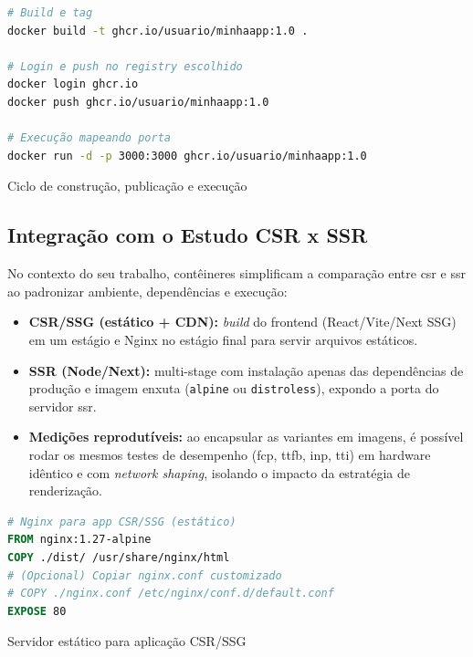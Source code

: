 \begin{codigo}[H]
\begin{lstlisting}[language=bash]
# Build e tag
docker build -t ghcr.io/usuario/minhaapp:1.0 .

# Login e push no registry escolhido
docker login ghcr.io
docker push ghcr.io/usuario/minhaapp:1.0

# Execução mapeando porta
docker run -d -p 3000:3000 ghcr.io/usuario/minhaapp:1.0
\end{lstlisting}
\caption{Ciclo de construção, publicação e execução}
\label{lst:docker-workflow}
\end{codigo}

\subsection{Integração com o Estudo CSR x SSR}
\label{sec:docker-csr-ssr}

No contexto do seu trabalho, contêineres simplificam a comparação entre \acrshort{csr} e \acrshort{ssr} ao padronizar ambiente, dependências e execução:

\begin{itemize}
  \item \textbf{CSR/SSG (estático + CDN):} \textit{build} do frontend (React/Vite/Next SSG) em um estágio e Nginx no estágio final para servir arquivos estáticos.  
  \item \textbf{SSR (Node/Next):} multi-stage com instalação apenas das dependências de produção e imagem enxuta (\texttt{alpine} ou \texttt{distroless}), expondo a porta do servidor \acrshort{ssr}.
  \item \textbf{Medições reprodutíveis:} ao encapsular as variantes em imagens, é possível rodar os mesmos testes de desempenho (\acrshort{fcp}, \acrshort{ttfb}, \acrshort{inp}, \acrshort{tti}) em hardware idêntico e com \textit{network shaping}, isolando o impacto da estratégia de renderização.
\end{itemize}

\begin{codigo}[H]
\begin{lstlisting}[language=Dockerfile]
# Nginx para app CSR/SSG (estático)
FROM nginx:1.27-alpine
COPY ./dist/ /usr/share/nginx/html
# (Opcional) Copiar nginx.conf customizado
# COPY ./nginx.conf /etc/nginx/conf.d/default.conf
EXPOSE 80
\end{lstlisting}
\caption{Servidor estático para aplicação CSR/SSG}
\label{lst:dockerfile-nginx-static}
\end{codigo}

